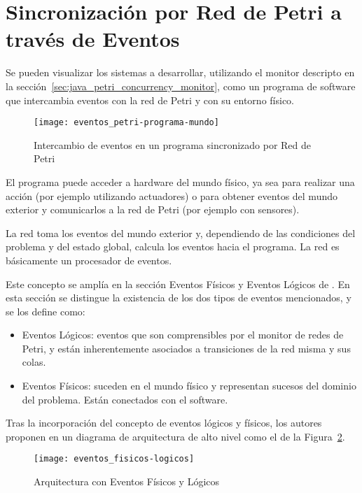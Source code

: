 \section{Sincronización por Red de Petri a través de Eventos}
\label{sec:sincronizacion_RdP_por_eventos}
Se pueden visualizar los sistemas a desarrollar, utilizando el monitor
descripto en la sección~\ref{sec:java_petri_concurrency_monitor}, como un programa de
software que intercambia eventos con la red de Petri y con su entorno físico.

\begin{figure}[h]
	\centering
	\texttt{[image: eventos\_petri-programa-mundo]}
	\caption{Intercambio de eventos en un programa sincronizado por Red de Petri}
	\label{fig:eventos_petri-programa-mundo}
\end{figure}

El programa puede acceder a hardware del mundo físico, ya sea para realizar una
acción (por ejemplo utilizando actuadores) o  para obtener eventos del mundo
exterior y comunicarlos a la red de Petri (por ejemplo con sensores).

La red toma los eventos del mundo exterior y, dependiendo de las condiciones del
problema y del estado global, calcula los eventos hacia el programa.
La red es básicamente un procesador de eventos. \cite{TesisMicolini}\cite{chimp}

Este concepto se amplía en la sección Eventos Físicos y Eventos
Lógicos de \cite{chimp}. En esta sección se distingue la existencia de los dos
tipos de eventos mencionados, y se los define como:
  \begin{itemize}
    \item Eventos Lógicos: eventos que son comprensibles por el monitor de
    redes de Petri, y están inherentemente asociados a transiciones de la red
    misma y sus colas.
    \item Eventos Físicos: suceden en el mundo físico y representan sucesos del
    dominio del problema. Están conectados con el software.
  \end{itemize}

Tras la incorporación del concepto de eventos lógicos y físicos, los autores
proponen en \cite{chimp} un diagrama de arquitectura de alto nivel como el de
la Figura~\ref{fig:eventos_fisicos-logicos}.

\begin{figure}[h]
	\centering
	\texttt{[image: eventos\_fisicos-logicos]}
	\caption{Arquitectura con Eventos Físicos y Lógicos}
	\label{fig:eventos_fisicos-logicos}
\end{figure}

